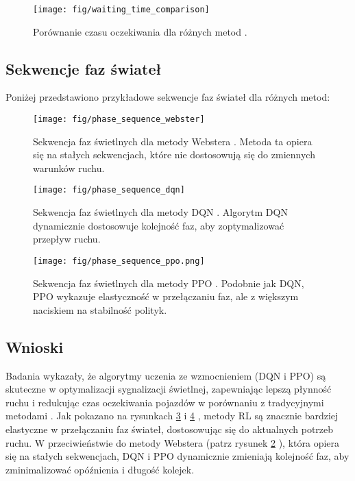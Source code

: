 \documentclass[12pt, a4paper]{article} %
\begin{document}
    \begin{figure}[h]
        \centering
        \texttt{[image: fig/waiting\_time\_comparison]}
        \caption{Porównanie czasu oczekiwania dla różnych metod \cite{Louw2022}.}
        \label{fig:waiting_time}
    \end{figure}

    \subsection{Sekwencje faz świateł}
    Poniżej przedstawiono przykładowe sekwencje faz świateł dla różnych metod:

    \begin{figure}[h]
        \centering
        \texttt{[image: fig/phase\_sequence\_webster]}
        \caption
        {Sekwencja faz świetlnych dla metody Webstera \cite{Louw2022}. Metoda ta opiera się na stałych sekwencjach,
            które nie dostosowują się do zmiennych warunków ruchu.}
        \label{fig:phase_webster}
    \end{figure}

    \begin{figure}[h]
        \centering
        \texttt{[image: fig/phase\_sequence\_dqn]}
        \caption
        {Sekwencja faz świetlnych dla metody DQN \cite{Louw2022}. Algorytm DQN dynamicznie dostosowuje kolejność faz,
            aby zoptymalizować przepływ ruchu.}
        \label{fig:phase_dqn}
    \end{figure}

    \begin{figure}[!h]
        \centering
        \texttt{[image: fig/phase\_sequence\_ppo.png]}
        \caption{Sekwencja faz świetlnych dla metody PPO \cite{Louw2022}. Podobnie jak DQN,
            PPO wykazuje elastyczność w przełączaniu faz, ale z większym naciskiem na stabilność polityk.}
        \label{fig:phase_ppo}
    \end{figure}

    \subsection{Wnioski}
    Badania wykazały, że algorytmy uczenia ze wzmocnieniem (DQN i PPO) są skuteczne w optymalizacji sygnalizacji
    świetlnej, zapewniając lepszą płynność ruchu i redukując czas oczekiwania pojazdów w porównaniu z tradycyjnymi
    metodami \cite{Louw2022}. Jak pokazano na rysunkach \ref{fig:phase_dqn} i \ref{fig:phase_ppo}
    , metody RL są znacznie bardziej elastyczne w przełączaniu faz świateł, dostosowując się do aktualnych potrzeb
    ruchu. W przeciwieństwie do metody Webstera (patrz rysunek \ref{fig:phase_webster}
    ), która opiera się na stałych sekwencjach, DQN i PPO dynamicznie zmieniają kolejność faz, aby zminimalizować
    opóźnienia i długość kolejek.
\end{document}
